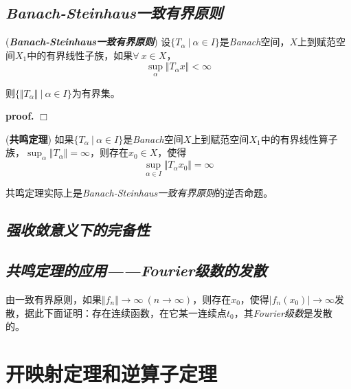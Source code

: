 \subsection*{\textsl{Banach-Steinhaus一致有界原则}}

\begin{mdframed}
    \begin{theorem}
        (\textbf{\textsl{Banach-Steinhaus一致有界原则}})  设$\{T_\alpha\ |\ \alpha\in I\}$是\textsl{Banach}空间，$X$上到赋范空间$X_1$中的有界线性子族，如果$\forall\ x\in X$，
        \begin{equation}
            \sup_{\alpha} \Vert T_\alpha x\Vert <\infty
        \end{equation}

        则$\{\Vert T_\alpha\Vert\ |\ \alpha\in I\}$为有界集。
    \end{theorem}
\end{mdframed}

\textbf{proof.} $\Box$

\begin{mdframed}
    \begin{theorem}
        (\textbf{共鸣定理}) 如果$\{T_\alpha\ |\ \alpha\in I\}$是\textsl{Banach}空间$X$上到赋范空间$X_1$中的有界线性算子族，$\sup_{\alpha}\Vert T_\alpha\Vert=\infty$，则存在$x_0\in X$，使得
        \begin{equation}
            \sup_{\alpha\in I}\Vert T_\alpha x_0\Vert =\infty
        \end{equation}
    \end{theorem}
\end{mdframed}

共鸣定理实际上是\textsl{Banach-Steinhaus一致有界原则}的逆否命题。

\subsection*{\textsl{强收敛意义下的完备性}}

\subsection*{\textsl{共鸣定理的应用——Fourier级数的发散}}

由一致有界原则，如果$\Vert f_n\Vert\rightarrow \infty\ (n\rightarrow \infty)$，则存在$x_0$，使得$\left|f_n(x_0)\right|\rightarrow \infty$发散，据此下面证明：存在连续函数，在它某一连续点$t_0$，其\textsl{Fourier级数}是发散的。

\section{开映射定理和逆算子定理}


